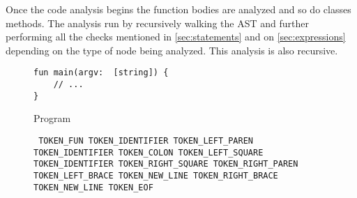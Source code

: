 Once the code analysis begins the function bodies are analyzed and so do classes methods. The analysis run by recursively walking the AST and further performing
all the checks mentioned in \autoref{sec:statements} and on \autoref{sec:expressions} depending on the type of node being analyzed.
This analysis is also recursive.

\begin{figure}[H]
	\centering
	\begin{subtable}{0.45\textwidth}
\begin{verbatim}
fun main(argv:  [string]) {
    // ...
}
\end{verbatim}
		\caption{Program}
	\end{subtable}
	\begin{subtable}{0.45\textwidth}
		\centering
        \texttt{
            TOKEN\_FUN TOKEN\_IDENTIFIER TOKEN\_LEFT\_PAREN TOKEN\_IDENTIFIER TOKEN\_COLON TOKEN\_LEFT\_SQUARE TOKEN\_IDENTIFIER
            TOKEN\_RIGHT\_SQUARE TOKEN\_RIGHT\_PAREN TOKEN\_LEFT\_BRACE TOKEN\_NEW\_LINE
            TOKEN\_RIGHT\_BRACE TOKEN\_NEW\_LINE
            TOKEN\_EOF
        }
		\caption{List of tokens}
	\end{subtable}
    \begin{subfigure}{0.45\textwidth}
		\centering
\end{subfigure}
\end{figure}
